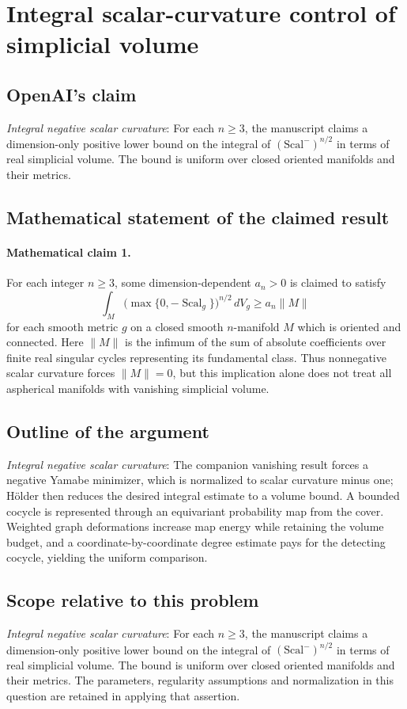 \documentclass[11pt]{article}
\begin{document}
\section*{Integral scalar-curvature control of simplicial volume}

\subsection{OpenAI's claim}
\textit{Integral negative scalar curvature}: For each $n\ge3$, the manuscript claims a dimension-only positive lower bound on the integral of $(\mathrm{Scal}^-)^{n/2}$ in terms of real simplicial volume. The bound is uniform over closed oriented manifolds and their metrics.

\subsection{Mathematical statement of the claimed result}
\paragraph{Mathematical claim 1.} For each integer $n\ge3$, some dimension-dependent $a_n>0$ is claimed to satisfy \[\int_M\bigl(\max\{0,-\operatorname{Scal}_g\}\bigr)^{n/2}\,dV_g\ge a_n\|M\|\] for each smooth metric $g$ on a closed smooth $n$-manifold $M$ which is oriented and connected. Here $\|M\|$ is the infimum of the sum of absolute coefficients over finite real singular cycles representing its fundamental class. Thus nonnegative scalar curvature forces $\|M\|=0$, but this implication alone does not treat all aspherical manifolds with vanishing simplicial volume.

\subsection{Outline of the argument}
\textit{Integral negative scalar curvature}: The companion vanishing result forces a negative Yamabe minimizer, which is normalized to scalar curvature minus one; Hölder then reduces the desired integral estimate to a volume bound. A bounded cocycle is represented through an equivariant probability map from the cover. Weighted graph deformations increase map energy while retaining the volume budget, and a coordinate-by-coordinate degree estimate pays for the detecting cocycle, yielding the uniform comparison.

\subsection{Scope relative to this problem}
\textit{Integral negative scalar curvature}: For each $n\ge3$, the manuscript claims a dimension-only positive lower bound on the integral of $(\mathrm{Scal}^-)^{n/2}$ in terms of real simplicial volume. The bound is uniform over closed oriented manifolds and their metrics. The parameters, regularity assumptions and normalization in this question are retained in applying that assertion.
\end{document}
